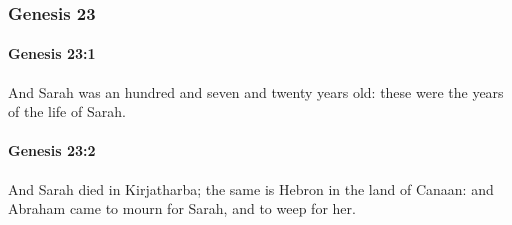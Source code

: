 	\subsubsection{Genesis 23} %
		\label{GENESIS-23}

		\paragraph{Genesis 23:1} %
			\label{GENESIS-23-1}

			And Sarah was an hundred and seven and twenty years old: these were the years of the life of Sarah.


		\paragraph{Genesis 23:2} %
			\label{GENESIS-23-2}

			And Sarah died in Kirjatharba; the same is Hebron in the land of Canaan: and Abraham came to mourn for Sarah, and to weep for her.


